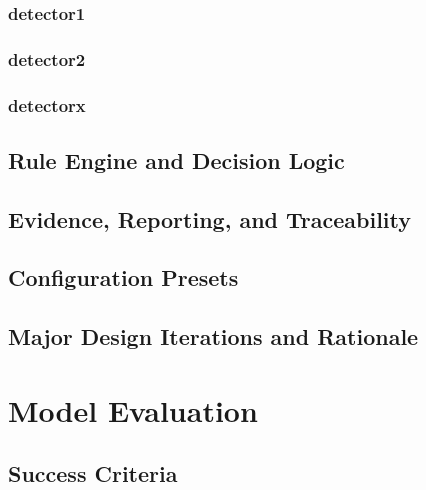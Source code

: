 \subsection*{detector1}\label{subsec:detector1}
\subsection*{detector2}\label{subsec:detector2}
\subsection*{detectorx}\label{subsec:detectorx}

\section{Rule Engine and Decision Logic}\label{sec:rule-engine}

\section{Evidence, Reporting, and Traceability}\label{sec:evidence}

\section{Configuration Presets}\label{sec:presets}

\section{Major Design Iterations and Rationale}\label{sec:iterations}


\chapter{Model Evaluation}\label{ch:evaluation}

\section{Success Criteria}\label{sec:success-criteria}

